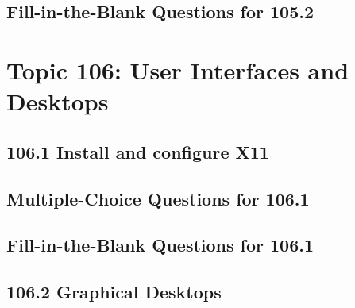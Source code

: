 \documentclass[a4paper]{report}
\begin{document}
\newpage
\section*{Fill-in-the-Blank Questions for 105.2}


\newpage
\chapter{Topic 106: User Interfaces and Desktops}


\newpage
\section*{106.1 Install and configure X11}

\newpage
\section*{Multiple-Choice Questions for 106.1}

\newpage
\section*{Fill-in-the-Blank Questions for 106.1}

\newpage
\section*{106.2 Graphical Desktops}

\newpage
\end{document}
